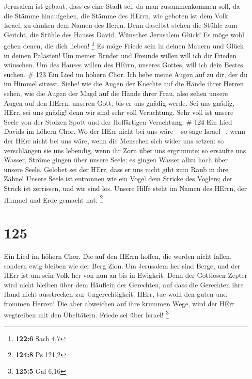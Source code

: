  Jerusalem ist gebaut, dass es eine Stadt sei, da man
zusammenkommen soll,  da die Stämme hinaufgehen, die Stämme
des HErrn, wie geboten ist dem Volk Israel, zu danken dem Namen des
Herrn.  Denn daselbst stehen die Stühle zum Gericht, die
Stühle des Hauses David.  Wünschet Jerusalem Glück! Es möge
wohl gehen denen, die dich lieben! \footnote{\textbf{122:6} Sach 4,7}
 Es möge Friede sein in deinen Mauern und Glück in deinen
Palästen!  Um meiner Brüder und Freunde willen will ich dir
Frieden wünschen.  Um des Hauses willen des HErrn, unseres
Gottes, will ich dein Bestes suchen. \# 123  Ein Lied im
höhern Chor. Ich hebe meine Augen auf zu dir, der du im Himmel sitzest.
 Siehe! wie die Augen der Knechte auf die Hände ihrer Herren
sehen, wie die Augen der Magd auf die Hände ihrer Frau, also sehen
unsere Augen auf den HErrn, unseren Gott, bis er uns gnädig werde.
 Sei uns gnädig, HErr, sei uns gnädig! denn wir sind sehr
voll Verachtung.  Sehr voll ist unsere Seele von der Stolzen
Spott und der Hoffärtigen Verachtung. \# 124  Ein Lied
Davids im höhern Chor. Wo der HErr nicht bei uns wäre -- so sage Israel
--,  wenn der HErr nicht bei uns wäre, wenn die Menschen
sich wider uns setzen:  so verschlängen sie uns lebendig,
wenn ihr Zorn über uns ergrimmte;  so ersäufte uns Wasser,
Ströme gingen über unsere Seele;  es gingen Wasser allzu
hoch über unsere Seele.  Gelobet sei der HErr, dass er uns
nicht gibt zum Raub in ihre Zähne!  Unsere Seele ist
entronnen wie ein Vogel dem Stricke des Voglers; der Strick ist
zerrissen, und wir sind los.  Unsere Hilfe steht im Namen
des HErrn, der Himmel und Erde gemacht hat. \footnote{\textbf{124:8} Ps
  121,2}

\hypertarget{section-39}{%
\section{125}\label{section-39}}

 Ein Lied im höhern Chor. Die auf den HErrn hoffen, die
werden nicht fallen, sondern ewig bleiben wie der Berg Zion.
 Um Jerusalem her sind Berge, und der HErr ist um sein Volk
her von nun an bis in Ewigkeit.  Denn der Gottlosen Zepter
wird nicht bleiben über dem Häuflein der Gerechten, auf dass die
Gerechten ihre Hand nicht ausstrecken zur Ungerechtigkeit. 
HErr, tue wohl den guten und frommen Herzen!  Die aber
abweichen auf ihre krummen Wege, wird der HErr wegtreiben mit den
Übeltätern. Friede sei über Israel! \footnote{\textbf{125:5} Gal 6,16}


